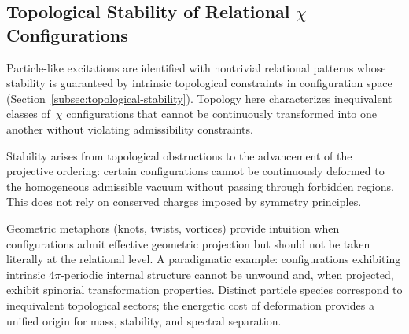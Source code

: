 \subsection{Topological Stability of Relational \texorpdfstring{$\chi$}{χ} Configurations}
  \label{app:relational_topological_stability}

  Particle-like excitations are identified with nontrivial relational
  patterns whose stability is guaranteed by intrinsic topological
  constraints in configuration space
  (Section~\ref{subsec:topological-stability}).
  Topology here characterizes inequivalent classes of~$\chi$
  configurations that cannot be continuously transformed into one another
  without violating admissibility constraints.

  Stability arises from topological obstructions to the advancement of
  the projective ordering: certain configurations cannot be continuously
  deformed to the homogeneous admissible vacuum without passing through
  forbidden regions.
  This does not rely on conserved charges imposed by symmetry principles.

  Geometric metaphors (knots, twists, vortices) provide intuition when
  configurations admit effective geometric projection but should not be
  taken literally at the relational level.
  A paradigmatic example: configurations exhibiting intrinsic
  $4\pi$-periodic internal structure cannot be unwound and, when projected,
  exhibit spinorial transformation properties.
  Distinct particle species correspond to inequivalent topological sectors;
  the energetic cost of deformation provides a unified origin for mass,
  stability, and spectral separation.
